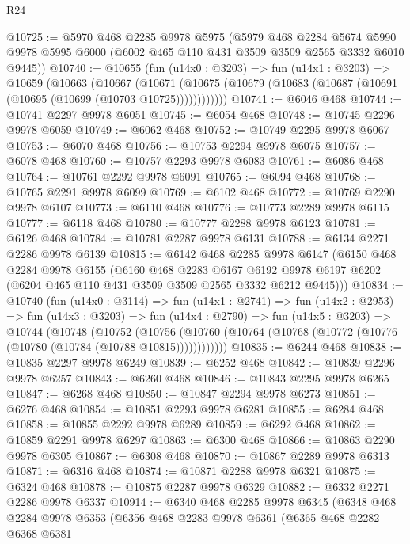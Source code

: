 \begin{lexlean}{R24}
\begin{coremodule}
@10725 := @5970
    @468
    @2285
    @9978
    @5975
    (@5979
      @468
      @2284
      @5674
      @5990
      @9978
      @5995
      @6000
      (@6002 @465 @110 @431 @3509 @3509 @2565 @3332 @6010 @9445))
@10740 := @10655
    (fun (u14x0 : @3203) =>
    fun (u14x1 : @3203) =>
    @10659
      (@10663
        (@10667
          (@10671 (@10675 (@10679 (@10683 (@10687 (@10691 (@10695 (@10699 (@10703 @10725))))))))))))
@10741 := @6046 @468
@10744 := @10741 @2297 @9978 @6051
@10745 := @6054 @468
@10748 := @10745 @2296 @9978 @6059
@10749 := @6062 @468
@10752 := @10749 @2295 @9978 @6067
@10753 := @6070 @468
@10756 := @10753 @2294 @9978 @6075
@10757 := @6078 @468
@10760 := @10757 @2293 @9978 @6083
@10761 := @6086 @468
@10764 := @10761 @2292 @9978 @6091
@10765 := @6094 @468
@10768 := @10765 @2291 @9978 @6099
@10769 := @6102 @468
@10772 := @10769 @2290 @9978 @6107
@10773 := @6110 @468
@10776 := @10773 @2289 @9978 @6115
@10777 := @6118 @468
@10780 := @10777 @2288 @9978 @6123
@10781 := @6126 @468
@10784 := @10781 @2287 @9978 @6131
@10788 := @6134 @2271 @2286 @9978 @6139
@10815 := @6142
    @468
    @2285
    @9978
    @6147
    (@6150
      @468
      @2284
      @9978
      @6155
      (@6160
        @468
        @2283
        @6167
        @6192
        @9978
        @6197
        @6202
        (@6204 @465 @110 @431 @3509 @3509 @2565 @3332 @6212 @9445)))
@10834 := @10740
    (fun (u14x0 : @3114) =>
    fun (u14x1 : @2741) =>
    fun (u14x2 : @2953) =>
    fun (u14x3 : @3203) =>
    fun (u14x4 : @2790) =>
    fun (u14x5 : @3203) =>
    @10744
      (@10748
        (@10752
          (@10756 (@10760 (@10764 (@10768 (@10772 (@10776 (@10780 (@10784 (@10788 @10815))))))))))))
@10835 := @6244 @468
@10838 := @10835 @2297 @9978 @6249
@10839 := @6252 @468
@10842 := @10839 @2296 @9978 @6257
@10843 := @6260 @468
@10846 := @10843 @2295 @9978 @6265
@10847 := @6268 @468
@10850 := @10847 @2294 @9978 @6273
@10851 := @6276 @468
@10854 := @10851 @2293 @9978 @6281
@10855 := @6284 @468
@10858 := @10855 @2292 @9978 @6289
@10859 := @6292 @468
@10862 := @10859 @2291 @9978 @6297
@10863 := @6300 @468
@10866 := @10863 @2290 @9978 @6305
@10867 := @6308 @468
@10870 := @10867 @2289 @9978 @6313
@10871 := @6316 @468
@10874 := @10871 @2288 @9978 @6321
@10875 := @6324 @468
@10878 := @10875 @2287 @9978 @6329
@10882 := @6332 @2271 @2286 @9978 @6337
@10914 := @6340
    @468
    @2285
    @9978
    @6345
    (@6348
      @468
      @2284
      @9978
      @6353
      (@6356
        @468
        @2283
        @9978
        @6361
        (@6365
          @468
          @2282
          @6368
          @6381

\end{coremodule}
\end{lexlean}
